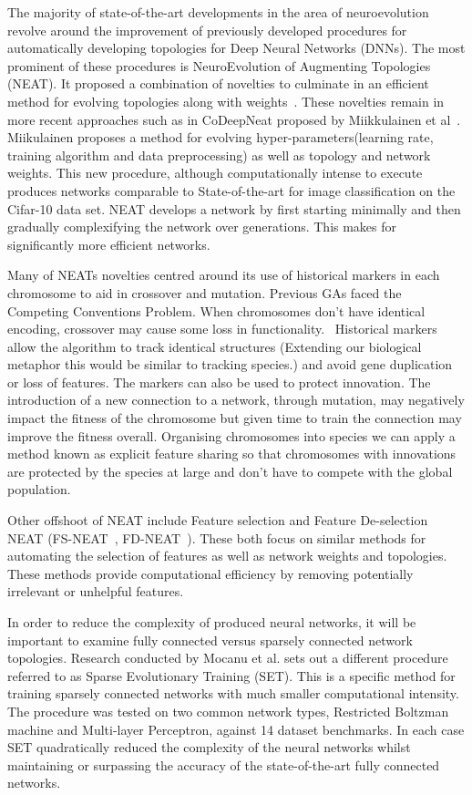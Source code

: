 \documentclass[]{monthly-report}
\begin{document}
The majority of state-of-the-art developments in the area of neuroevolution revolve around the improvement of previously developed procedures for automatically developing topologies for Deep Neural Networks (DNNs). The most prominent of these procedures is NeuroEvolution of Augmenting Topologies (NEAT). It proposed a combination of novelties to culminate in an efficient method for evolving topologies along with weights~\cite{Stanley:2002:ERL:2955491.2955578}. These novelties remain in more recent approaches such as in CoDeepNeat proposed by Miikkulainen et al~\cite{Miikkulainen2017}. Miikulainen proposes a method for evolving hyper-parameters(learning rate, training algorithm and data preprocessing) as well as topology and network weights. This new procedure, although computationally  intense to execute produces networks comparable to State-of-the-art for image classification on the Cifar-10 data set. NEAT develops a network by first starting minimally and then gradually complexifying the network over generations. This makes for significantly more efficient networks.

Many of NEATs novelties centred around its use of historical markers in each chromosome to aid in crossover and mutation. Previous GAs faced the Competing Conventions Problem. When chromosomes don't have identical encoding, crossover may cause some loss in functionality.~\cite{Radcliffe1993} Historical markers allow the algorithm to track identical structures (Extending our biological metaphor this would be similar to tracking species.) and avoid gene duplication or loss of features. The markers can also be used to protect innovation. The introduction of a new connection to a network, through mutation, may negatively impact the fitness of the chromosome but given time to train the connection may improve the fitness overall. Organising chromosomes into species we can apply a method known as explicit feature sharing so that chromosomes with innovations are protected by the species at large and don't have to compete with the global population. 

Other offshoot of NEAT include Feature selection and Feature De-selection NEAT (FS-NEAT~\cite{Whiteson20051225}, FD-NEAT~\cite{MP:MP3941}). These both focus on similar methods for automating the selection of features as well as network weights and topologies. These methods provide computational efficiency by removing potentially irrelevant or unhelpful features.

In order to reduce the complexity of produced neural networks, it will be important to examine fully connected versus sparsely connected network topologies. Research conducted by Mocanu et al.\cite{DBLP:journals/corr/MocanuMSNGL17} sets out a different procedure referred to as Sparse Evolutionary Training (SET). This is a specific method for training sparsely connected networks with much smaller computational intensity. The procedure was tested on two common network types, Restricted Boltzman machine and Multi-layer Perceptron, against 14 dataset benchmarks.  In each case SET quadratically reduced the complexity of the neural networks whilst maintaining or surpassing the accuracy of the state-of-the-art fully connected networks.
\end{document}

